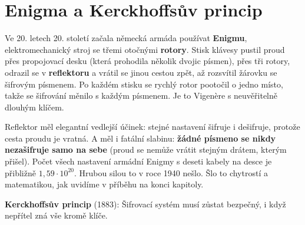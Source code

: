 \section{Enigma a Kerckhoffsův princip}

Ve 20. letech 20. století začala německá armáda používat \textbf{Enigmu}, elektromechanický stroj se třemi otočnými \textbf{rotory}. Stisk klávesy pustil proud přes propojovací desku (která prohodila několik dvojic písmen), přes tři rotory, odrazil se v \textbf{reflektoru} a vrátil se jinou cestou zpět, až rozsvítil žárovku se šifrovým písmenem. Po každém stisku se rychlý rotor pootočil o jedno místo, takže se šifrování měnilo s každým písmenem. Je to Vigenère s neuvěřitelně dlouhým klíčem.

\begin{center}
\end{center}

Reflektor měl elegantní vedlejší účinek: stejné nastavení šifruje i dešifruje, protože cesta proudu je vratná. A měl i fatální slabinu: \textbf{žádné písmeno se nikdy nezašifruje samo na sebe} (proud se nemůže vrátit stejným drátem, kterým přišel). Počet všech nastavení armádní Enigmy s deseti kabely na desce je přibližně $1{,}59\cdot 10^{20}$. Hrubou silou to v roce 1940 nešlo. Šlo to chytrostí a matematikou, jak uvidíme v příběhu na konci kapitoly.

\begin{definitionbox}
  \textbf{Kerckhoffsův princip} (1883): Šifrovací systém musí zůstat bezpečný, i když nepřítel zná vše kromě klíče.
\end{definitionbox}

